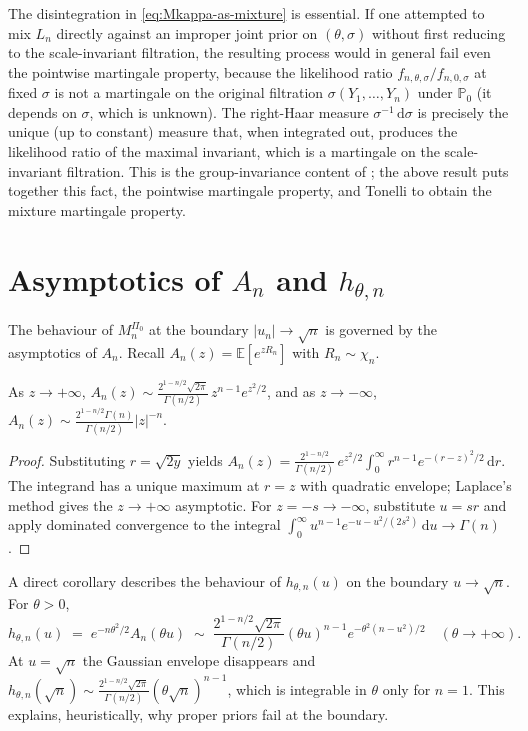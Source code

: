 \documentclass[12pt, a4paper]{report}
\newcommand{\E}{\mathbb{E}}
\newcommand{\dd}{\,\mathrm{d}}
\newcommand{\1}{\mathbf{1}}
\begin{document}
\begin{remark}
    The disintegration in \eqref{eq:Mkappa-as-mixture} is essential. If one attempted to mix \(L_n\) directly against an improper joint prior on \((\theta,\sigma)\) without first reducing to the scale-invariant filtration, the resulting process would in general fail even the pointwise martingale property, because the likelihood ratio
\(f_{n,\theta,\sigma}/f_{n,0,\sigma}\) at fixed \(\sigma\) is not a
martingale on the original filtration \(\sigma(Y_1,\ldots,Y_n)\) under
\(\mathbb{P}_0\) (it depends on \(\sigma\), which is unknown). The
right-Haar measure \(\sigma^{-1}\dd\sigma\) is precisely the unique
(up to constant) measure that, when integrated out, produces the
likelihood ratio of the maximal invariant, which is a
martingale on the scale-invariant filtration. This is the
group-invariance content of \cite{PerezOrtiz2024}; the above result puts together this fact, the pointwise martingale property,
and Tonelli to obtain the mixture martingale property.
\end{remark}





\section{Asymptotics of \(A_n\) and \(h_{\theta,n}\)}
The behaviour of \(M_n^{\Pi_0}\) at the boundary \(|u_n|\to\sqrt n\) is
governed by the asymptotics of \(A_n\). Recall \(A_n(z)=\E[e^{zR_n}]\)
with \(R_n\sim\chi_n\).

\begin{lemma}\label{lem:An-asymp}
As \(z\to+\infty\),
\(A_n(z)\sim \frac{2^{1-n/2}\sqrt{2\pi}}{\Gamma(n/2)}\,z^{n-1}e^{z^2/2}\),
and as \(z\to-\infty\),
\(A_n(z)\sim \frac{2^{1-n/2}\Gamma(n)}{\Gamma(n/2)}|z|^{-n}\).
\end{lemma}

\begin{proof}
Substituting \(r=\sqrt{2y}\) yields
\(A_n(z) = \frac{2^{1-n/2}}{\Gamma(n/2)}\,e^{z^2/2}\int_0^\infty
r^{n-1}e^{-(r-z)^2/2}\dd r\). The integrand has a unique maximum at
\(r=z\) with quadratic envelope; Laplace's method gives the
\(z\to+\infty\) asymptotic. For \(z=-s\to-\infty\), substitute
\(u=sr\) and apply dominated convergence to the integral
\(\int_0^\infty u^{n-1}e^{-u-u^2/(2s^2)}\dd u\to\Gamma(n)\).
\end{proof}

A direct corollary describes the behaviour of \(h_{\theta,n}(u)\) on
the boundary \(u\to\sqrt n\). For \(\theta>0\),
\begin{equation}\label{eq:h-asymp}
  h_{\theta,n}(u)\;=\;e^{-n\theta^2/2}A_n(\theta u)
  \;\sim\;\frac{2^{1-n/2}\sqrt{2\pi}}{\Gamma(n/2)}
   (\theta u)^{n-1}e^{-\theta^2(n-u^2)/2}
   \quad (\theta\to+\infty).
\end{equation}
At \(u=\sqrt n\) the Gaussian envelope disappears and
\(h_{\theta,n}(\sqrt n)\sim \frac{2^{1-n/2}\sqrt{2\pi}}{\Gamma(n/2)}
(\theta\sqrt n)^{n-1}\), which is integrable in \(\theta\) only for
\(n=1\). This explains, heuristically, why proper priors fail at the
boundary.
\end{document}
